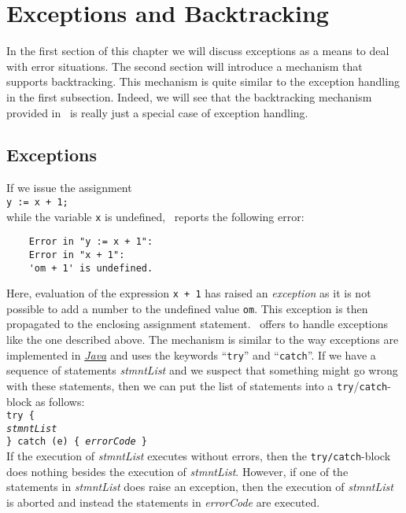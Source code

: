 \chapter{Exceptions and Backtracking}
In the first section of this chapter we will discuss exceptions as a means to deal with error
situations.  The second section will introduce  a mechanism that supports backtracking. 
This mechanism is quite similar to the exception handling in the first subsection.  Indeed, we
will see that the backtracking mechanism provided in \setlx\ is really just a special case of
exception handling.

\section{Exceptions}
If we issue the assignment
\\[0.2cm]
\hspace*{1.3cm}
\texttt{y := x + 1;}
\\[0.2cm]
while the variable \texttt{x} is undefined, \setlx\ reports the following error:
\begin{verbatim}
    Error in "y := x + 1":
    Error in "x + 1":
    'om + 1' is undefined.
\end{verbatim}
Here, evaluation of the expression \texttt{x + 1} has raised an \emph{exception} 
as it is not possible to add a number to the undefined value \texttt{om}.  This exception is then
propagated to the enclosing assignment statement. \setlx\ offers to handle exceptions like the
one described above.  The mechanism is similar to the way exceptions
are implemented in 
\href{http://docs.oracle.com/javase/tutorial/essential/exceptions/}{\textsl{Java}} and uses the keywords
``\texttt{try}'' and ``\texttt{catch}''.   If we have a sequence of statements
\textsl{stmntList} and we suspect that 
something might go wrong with these statements, then we can put the list of statements into a
\texttt{try}/\texttt{catch}-block as follows:
\\[0.2cm]
\hspace*{1.3cm}
\texttt{try \{}
\\
\hspace*{1.8cm}
\texttt{\textsl{stmntList}}
\\
\hspace*{1.3cm}
\texttt{\} catch (e) \{ \textsl{errorCode} \}}
\\[0.2cm]
If the execution of \textsl{stmntList} executes without errors, then the
\texttt{try/catch}-block does nothing besides the execution of \textsl{stmntList}.  However, if
one of the statements in \textsl{stmntList} does raise an exception, then the execution of 
\textsl{stmntList} is aborted and instead the statements in \textsl{errorCode} are executed.

